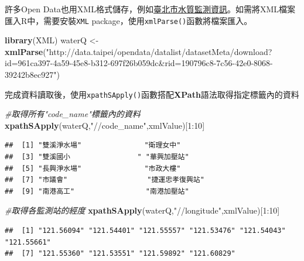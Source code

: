 \documentclass[]{book}
\newenvironment{Shaded}{\begin{snugshade}}{\end{snugshade}}
\newcommand{\KeywordTok}[1]{\textcolor[rgb]{0.13,0.29,0.53}{\textbf{{#1}}}}
\newcommand{\DecValTok}[1]{\textcolor[rgb]{0.00,0.00,0.81}{{#1}}}
\newcommand{\StringTok}[1]{\textcolor[rgb]{0.31,0.60,0.02}{{#1}}}
\newcommand{\CommentTok}[1]{\textcolor[rgb]{0.56,0.35,0.01}{\textit{{#1}}}}
\newcommand{\NormalTok}[1]{{#1}}
\theoremstyle{definition}
\theoremstyle{definition}
\theoremstyle{remark}
\begin{document}
許多Open
Data也用XML格式儲存，例如\href{http://data.taipei/opendata/datalist/datasetMeta/download?id=961ca397-4a59-45e8-b312-697f26b059dc\&rid=190796c8-7c56-42e0-8068-39242b8ec927}{臺北市水質監測資訊}。如需將XML檔案匯入R中，需要安裝\texttt{XML}
\citep{R-XML} package，使用\texttt{xmlParse()}函數將檔案匯入。

\begin{Shaded}
\begin{Highlighting}[]
\KeywordTok{library}\NormalTok{(XML)}
\NormalTok{waterQ <-}\StringTok{ }\KeywordTok{xmlParse}\NormalTok{(}\StringTok{"http://data.taipei/opendata/datalist/datasetMeta/download?id=961ca397-4a59-45e8-b312-697f26b059dc&rid=190796c8-7c56-42e0-8068-39242b8ec927"}\NormalTok{)}
\end{Highlighting}
\end{Shaded}

完成資料讀取後，使用\texttt{xpathSApply()}函數搭配\textbf{XPath}語法取得指定標籤內的資料

\begin{Shaded}
\begin{Highlighting}[]
\CommentTok{#取得所有"code_name"標籤內的資料}
\KeywordTok{xpathSApply}\NormalTok{(waterQ,}\StringTok{"//code_name"}\NormalTok{,xmlValue)[}\DecValTok{1}\NormalTok{:}\DecValTok{10}\NormalTok{]}
\end{Highlighting}
\end{Shaded}

\begin{verbatim}
##  [1] "雙溪淨水場"               "衛理女中"                
##  [3] "雙溪國小                " "華興加壓站"              
##  [5] "長興淨水場"               "市政大樓"                
##  [7] "市議會"                   "捷運忠孝復興站"          
##  [9] "南港高工"                 "南港加壓站"
\end{verbatim}

\begin{Shaded}
\begin{Highlighting}[]
\CommentTok{#取得各監測站的經度}
\KeywordTok{xpathSApply}\NormalTok{(waterQ,}\StringTok{"//longitude"}\NormalTok{,xmlValue)[}\DecValTok{1}\NormalTok{:}\DecValTok{10}\NormalTok{]}
\end{Highlighting}
\end{Shaded}

\begin{verbatim}
##  [1] "121.56094" "121.54401" "121.55557" "121.53476" "121.54043" "121.55661"
##  [7] "121.55360" "121.53551" "121.59892" "121.60829"
\end{verbatim}
\end{document}
